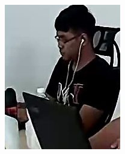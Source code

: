 \begin{figure}[!ht]
    \centering
    \begin{subfigure}[b]{0.2\textwidth}
        \centering
        \includegraphics[width=\textwidth]{chapter4/images/fei_4.jpg}
        \label{fig:ex_5}
    \end{subfigure}
    \begin{subfigure}[b]{0.2\textwidth}
        \centering

\end{subfigure}
\end{figure}
